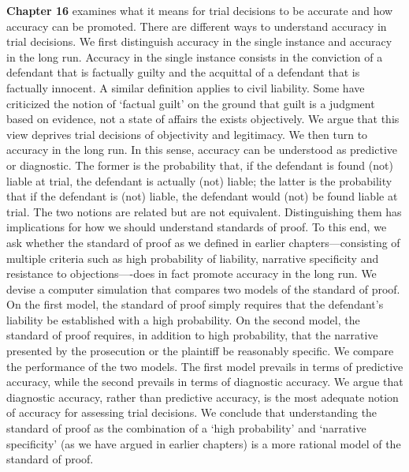 \documentclass[
  10pt,
  dvipsnames,enabledeprecatedfontcommands]{scrartcl}
\begin{document}
\textbf{Chapter 16} examines what it means for trial decisions to be
accurate and how accuracy can be promoted. There are different ways to
understand accuracy in trial decisions. We first distinguish accuracy in
the single instance and accuracy in the long run. Accuracy in the single
instance consists in the conviction of a defendant that is factually
guilty and the acquittal of a defendant that is factually innocent. A
similar definition applies to civil liability. Some have criticized the
notion of `factual guilt' on the ground that guilt is a judgment based
on evidence, not a state of affairs the exists objectively. We argue
that this view deprives trial decisions of objectivity and legitimacy.
We then turn to accuracy in the long run. In this sense, accuracy can be
understood as predictive or diagnostic. The former is the probability
that, if the defendant is found (not) liable at trial, the defendant is
actually (not) liable; the latter is the probability that if the
defendant is (not) liable, the defendant would (not) be found liable at
trial. The two notions are related but are not equivalent.
Distinguishing them has implications for how we should understand
standards of proof. To this end, we ask whether the standard of proof as
we defined in earlier chapters---consisting of multiple criteria such as
high probability of liability, narrative specificity and resistance to
objections----does in fact promote accuracy in the long run. We devise a
computer simulation that compares two models of the standard of proof.
On the first model, the standard of proof simply requires that the
defendant's liability be established with a high probability. On the
second model, the standard of proof requires, in addition to high
probability, that the narrative presented by the prosecution or the
plaintiff be reasonably specific. We compare the performance of the two
models. The first model prevails in terms of predictive accuracy, while
the second prevails in terms of diagnostic accuracy. We argue that
diagnostic accuracy, rather than predictive accuracy, is the most
adequate notion of accuracy for assessing trial decisions. We conclude
that understanding the standard of proof as the combination of a `high
probability' and `narrative specificity' (as we have argued in earlier
chapters) is a more rational model of the standard of proof.
\end{document}
